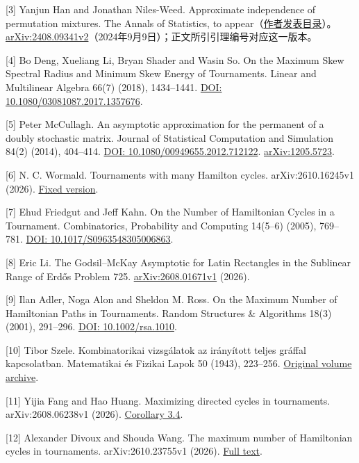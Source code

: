 \documentclass[11pt,a4paper]{article}
\begin{document}
{[}3{]} Yanjun Han and Jonathan Niles-Weed. Approximate independence of permutation mixtures. The Annals of Statistics, to appear（\href{https://yanjunhan2021.github.io/publication.html}{作者发表目录}）。\href{https://arxiv.org/html/2408.09341v2}{arXiv:2408.09341v2}（2024年9月9日）；正文所引引理编号对应这一版本。

{[}4{]} Bo Deng, Xueliang Li, Bryan Shader and Wasin So. On the Maximum Skew Spectral Radius and Minimum Skew Energy of Tournaments. Linear and Multilinear Algebra 66(7) (2018), 1434--1441. \href{https://doi.org/10.1080/03081087.2017.1357676}{DOI: 10.1080/03081087.2017.1357676}.

{[}5{]} Peter McCullagh. An asymptotic approximation for the permanent of a doubly stochastic matrix. Journal of Statistical Computation and Simulation 84(2) (2014), 404--414. \href{https://doi.org/10.1080/00949655.2012.712122}{DOI: 10.1080/00949655.2012.712122}. \href{https://arxiv.org/abs/1205.5723}{arXiv:1205.5723}.

{[}6{]} N. C. Wormald. Tournaments with many Hamilton cycles. arXiv:2610.16245v1 (2026). \href{https://arxiv.org/html/2610.16245v1}{Fixed version}.

{[}7{]} Ehud Friedgut and Jeff Kahn. On the Number of Hamiltonian Cycles in a Tournament. Combinatorics, Probability and Computing 14(5--6) (2005), 769--781. \href{https://doi.org/10.1017/S0963548305006863}{DOI: 10.1017/S0963548305006863}.

{[}8{]} Eric Li. The Godsil--McKay Asymptotic for Latin Rectangles in the Sublinear Range of Erdős Problem 725. \href{https://arxiv.org/html/2608.01671v1}{arXiv:2608.01671v1} (2026).

{[}9{]} Ilan Adler, Noga Alon and Sheldon M. Ross. On the Maximum Number of Hamiltonian Paths in Tournaments. Random Structures \& Algorithms 18(3) (2001), 291--296. \href{https://doi.org/10.1002/rsa.1010}{DOI: 10.1002/rsa.1010}.

{[}10{]} Tibor Szele. Kombinatorikai vizsgálatok az irányított teljes gráffal kapcsolatban. Matematikai és Fizikai Lapok 50 (1943), 223--256. \href{https://real-j.mtak.hu/7300/}{Original volume archive}.

{[}11{]} Yijia Fang and Hao Huang. Maximizing directed cycles in tournaments. arXiv:2608.06238v1 (2026). \href{https://arxiv.org/html/2608.06238v1\#S3}{Corollary 3.4}.

{[}12{]} Alexander Divoux and Shouda Wang. The maximum number of Hamiltonian cycles in tournaments. arXiv:2610.23755v1 (2026). \href{https://arxiv.org/html/2610.23755v1}{Full text}.
\endgroup
\end{document}
